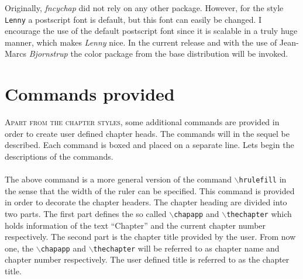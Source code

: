 \documentclass{report}
\newcommand{\sk}{\vspace{0.2 cm}}
\newcommand{\A}[1]{{$\backslash${\tt #1}}}
\newcommand{\nsp}{\mbox{\hspace{-1 cm}}}
\begin{document}
    Originally, \textsl{fncychap} did not rely on any other package. However, for the
    style {\tt Lenny} a postscript font is default, but this font can
    easily be changed. I encourage the use of the default postscript
    font since it is scalable in a truly huge manner, which makes
    {\em Lenny} nice. In the current release and with the use of
    Jean-Marcs \textsl{Bjornstrup} the color package from the base
    distribution will be invoked.
    
  \chapter{Commands provided}
  \lettrine{A}{part from the chapter styles}, some additional commands are
  provided in order to create user defined chapter heads. The commands
  will in the sequel be described. Each command is boxed and placed on
  a separate line. Lets begin the descriptions of the commands.\sk\\ 
  \nsp\fbox{\A{mghrulefill}\{{\em width}\}}\sk\\
  The above command is a more general version of the command
  \A{hrulefill} in the sense that the width of the ruler can be
  specified. This command is provided in order to decorate the chapter
  headers. The chapter heading are divided into two parts. The first
  part defines the so called \A{chapapp} and \A{thechapter} which
  holds information of the text ``Chapter'' and the current chapter number
  respectively. The second part is the chapter title provided by the
  user. From now one, the \A{chapapp} and \A{thechapter} will be
  referred to as chapter name and chapter number respectively. The
  user defined title is referred to as the chapter title.
\end{document}
